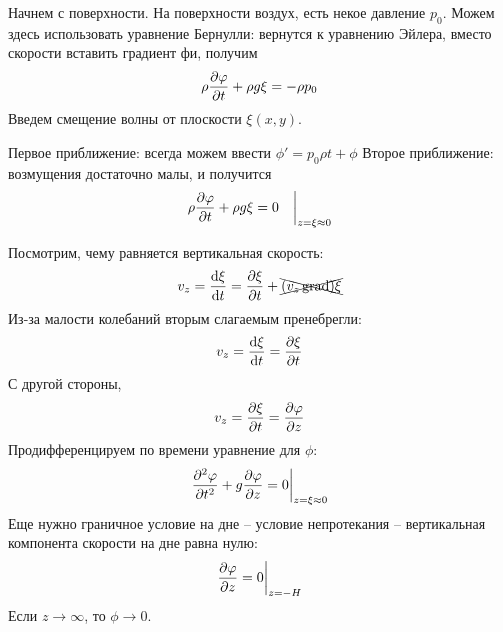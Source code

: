 Начнем с поверхности. На поверхности воздух, есть некое давление $p_0$. Можем здесь использовать уравнение Бернулли: вернутся к уравнению Эйлера, вместо скорости вставить градиент фи, получим
\begin{equation}
	\rho\pdv{\varphi}{t}+\rho g\xi=-\rho p_0
\end{equation}
Введем смещение волны от плоскости $\xi(x,y)$.

Первое приближение: всегда можем ввести $\phi'=p_0\rho t+\phi$
Второе приближение: возмущения достаточно малы, и получится
\begin{equation}
	\rho\pdv{\varphi}{t}+\rho g\xi=0 \quad \bigg|_{z=\xi\approx0}
\end{equation}

Посмотрим, чему равняется вертикальная скорость:
\begin{equation}
	v_z=\dv{\xi}{t}=\pdv{\xi}{t}+\xcancel{(v_z\operatorname{grad})\xi}
\end{equation}
Из-за малости колебаний вторым слагаемым пренебрегли:
\begin{equation}
	v_z=\dv{\xi}{t}=\pdv{\xi}{t}
\end{equation}
С другой стороны, 
\begin{equation}
	v_z=\pdv{\xi}{t}=\pdv{\varphi}{z}
\end{equation}
Продифференцируем по времени уравнение для $\phi$:
\begin{equation}
	\pdv[2]{\varphi}{t}+g\pdv{\varphi}{z}=0\bigg|_{z=\xi\approx0}
\end{equation}
Еще нужно граничное условие на дне -- условие непротекания -- вертикальная компонента скорости на дне равна нулю:
\begin{equation}
	\pdv{\varphi}{z}=0 \bigg|_{z=-H}
\end{equation}
Если $z\to\infty$, то $\phi \to 0$.

